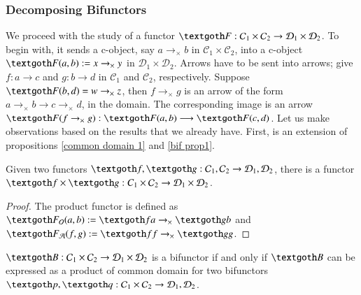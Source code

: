 \documentclass [12pt]{book}
\begin{document}
\subsubsection{Decomposing Bifunctors}

We proceed with the study of a functor $\textgoth F:\mathcal C_1\times\mathcal C_2\rightarrow\mathcal D_1\times\mathcal D_2$. To begin with, it sends a c-object, say $a\rightarrow_\times b$ in $\mathcal C_1\times\mathcal C_2$, into a c-object $\textgoth F(a,b):=x\rightarrow_\times y$ in $\mathcal D_1\times\mathcal D_2$. Arrows have to be sent into arrows; give $f:a\rightarrow c$ and $g:b\rightarrow d$ in $\mathcal C_1$ and $\mathcal C_2$, respectively. Suppose $\textgoth F(b,d)=w\rightarrow_\times z$, then $f\rightarrow_\times g$ is an arrow of the form $a\rightarrow_\times b\longrightarrow c\rightarrow_\times d$, in the domain. The corresponding image is an arrow $\textgoth F(f\rightarrow_\times g):\textgoth F(a,b)\longrightarrow \textgoth F(c,d)$. Let us make observations based on the results that we already have. First, is an extension of propositions \ref{common domain 1} and \ref{bif prop1}.

\begin{proposition}Given two functors $\textgoth f,\textgoth g:\mathcal C_1,\mathcal C_2\rightarrow\mathcal D_1,\mathcal D_2$, there is a functor $\textgoth f\times\textgoth g:C_1\times\mathcal C_2\rightarrow\mathcal D_1\times\mathcal D_2$.\end{proposition}

\begin{proof}The product functor is defined as $\textgoth F_\mathcal O(a,b):=\textgoth fa\rightarrow_\times\textgoth gb$ and $\textgoth F_\mathcal A(f,g):=\textgoth ff\rightarrow_\times\textgoth gg$.\end{proof}

\begin{theorem}$\textgoth B:\mathcal C_1\times\mathcal C_2\rightarrow\mathcal D_1\times\mathcal D_2$ is a bifunctor if and only if $\textgoth B$ can be expressed as a product of common domain for two bifunctors $\textgoth p,\textgoth q:\mathcal C_1\times\mathcal C_2\rightarrow\mathcal D_1,\mathcal D_2$.\end{theorem}
\end{document}
